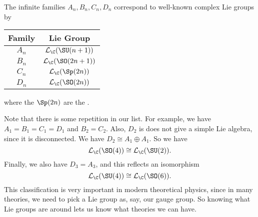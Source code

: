 \documentclass[a4paper]{article}
\begin{document}
\begin{thm}
\begin{center}
  \end{center}
  \begin{center}
  \end{center}
\end{thm}

\begin{eg}
  The infinite families $A_n, B_n, C_n, D_n$ correspond to well-known complex Lie groups by
  \begin{center}
    \begin{tabular}{cc}
      \toprule
      Family & Lie Group\\
      \midrule
      $A_n$ & $\mathcal{L}_\C(\SU(n + 1))$\\
      $B_n$ & $\mathcal{L}_\C(\SO(2n + 1))$\\
      $C_n$ & $\mathcal{L}_\C (\Sp(2n))$\\
      $D_n$ & $\mathcal{L}_\C (\SO(2n))$\\
      \bottomrule
    \end{tabular}
  \end{center}
  where the $\Sp(2n)$ are the .
\end{eg}

Note that there is some repetition in our list. For example, we have $A_1 = B_1 = C_1 = D_1$ and $B_2 = C_2$. Also, $D_2$ is does not give a simple Lie algebra, since it is disconnected. We have $D_2 \cong A_1 \oplus A_1$. So we have
\[
  \mathcal{L}_\C(\SO(4)) \cong \mathcal{L}_\C(\SU(2)).
\]
Finally, we also have $D_3 = A_3$, and this reflects an isomorphism
\[
  \mathcal{L}_\C(\SU(4)) \cong \mathcal{L}_\C(\SO(6)).
\]
This classification is very important in modern theoretical physics, since in many theories, we need to pick a Lie group as, say, our gauge group. So knowing what Lie groups are around lets us know what theories we can have.
\end{document}
